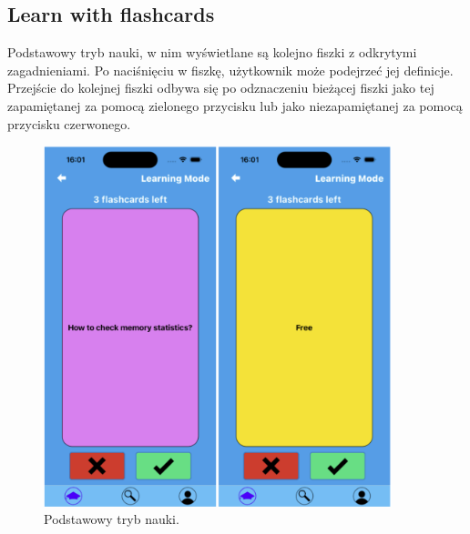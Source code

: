 \subsection{Learn with flashcards}
Podstawowy tryb nauki, w nim wyświetlane są kolejno fiszki z odkrytymi zagadnieniami. Po naciśnięciu w fiszkę, użytkownik może podejrzeć jej definicje. Przejście do kolejnej fiszki odbywa się po odznaczeniu bieżącej fiszki jako tej zapamiętanej za pomocą zielonego przycisku lub jako niezapamiętanej za pomocą przycisku czerwonego.


\begin{figure}[H]
    \centering
    \includegraphics[width=0.9\textwidth]{chapters/chapter_10/images_mobile/mobile_learn}
    \caption{Podstawowy tryb nauki.}
    \label{img:mobile_learn}
\end{figure}



